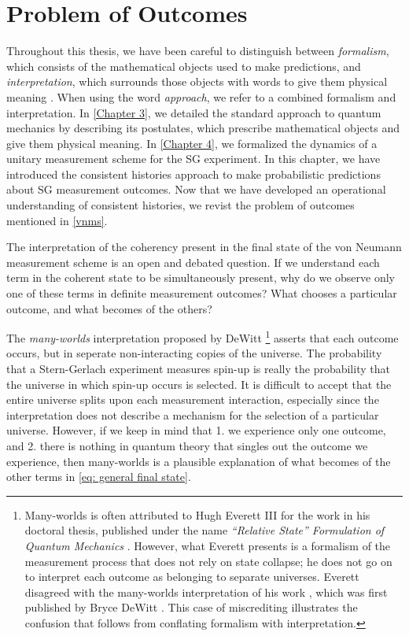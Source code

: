 \section{Problem of Outcomes} \label{problem of outcomes}
Throughout this thesis, we have been careful to distinguish between \textit{formalism}, which consists of the mathematical objects used to make predictions, and \textit{interpretation}, which surrounds those objects with words to give them physical meaning \cite{baumann}. When using the word \textit{approach}, we refer to a combined formalism and interpretation. In \autoref{Chapter 3}, we detailed the standard approach to quantum mechanics by describing its postulates, which prescribe mathematical objects and give them physical meaning. In \autoref{Chapter 4}, we formalized the dynamics of a unitary measurement scheme for the SG experiment. In this chapter, we have introduced the consistent histories approach to make probabilistic predictions about SG measurement outcomes. Now that we have developed an operational understanding of consistent histories, we revist the problem of outcomes mentioned in \autoref{vnms}.

The interpretation of the coherency present in the final state of the von Neumann measurement scheme \label{eq: general final state} is an open and debated question. If we understand each term in the coherent state to be simultaneously present, why do we observe only one of these terms in definite measurement outcomes? What chooses a particular outcome, and what becomes of the others?

The \textit{many-worlds} interpretation proposed by DeWitt \footnote{Many-worlds is often attributed to Hugh Everett III for the work in his doctoral thesis, published under the name \textit{``Relative State'' Formulation of Quantum Mechanics} \cite{everett}. However, what Everett presents is a formalism of the measurement process that does not rely on state collapse; he does not go on to interpret each outcome as belonging to separate universes. Everett disagreed with the many-worlds interpretation of his work \cite{barrett}, which was first published by Bryce DeWitt \cite{dewitt}. This case of miscrediting illustrates the confusion that follows from conflating formalism with interpretation.} asserts that each outcome occurs, but in seperate non-interacting copies of the universe. The probability that a Stern-Gerlach experiment measures spin-up is really the probability that the universe in which spin-up occurs is selected. It is difficult to accept that the entire universe splits upon each measurement interaction, especially since the interpretation does not describe a mechanism for the selection of a particular universe. However, if we keep in mind that 1. we experience only one outcome, and 2. there is nothing in quantum theory that singles out the outcome we experience, then many-worlds is a plausible explanation of what becomes of the other terms in \autoref{eq: general final state}.

